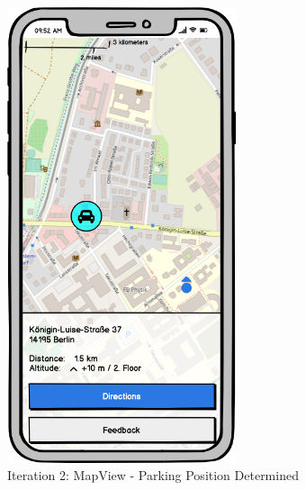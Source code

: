 \begin{figure}[H]
  \centering
  \begin{minipage}[b]{0.45\textwidth}
    \centering
    \includegraphics[width=0.6\textwidth]{images/UI/Iteration2-MapView-ParkingPositionDetermined.png}
    \caption{Iteration 2: MapView - Parking Position Determined}
    \label{fig:i2-mv-parking}
  \end{minipage}
  \hfill
  \begin{minipage}[b]{0.45\textwidth}
    \centering

\end{minipage}
\end{figure}
